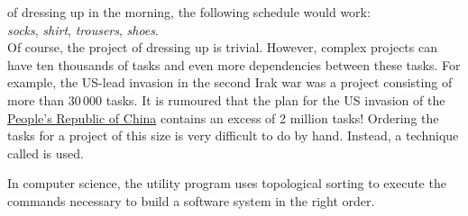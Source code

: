 of dressing up in the morning, the following schedule would work:
\\[0.2cm]
\hspace*{1.3cm}
\textsl{socks}, \textsl{shirt}, \textsl{trousers}, \textsl{shoes}.
\\[0.2cm]
Of course, the project of dressing up is trivial.
However, complex projects can have ten thousands of tasks and even more dependencies between these tasks.  For
example, the US-lead invasion in the second Irak war was a project consisting of more than $30\,000$ tasks.
It is rumoured that the plan for the US invasion of the
\href{https://en.wikipedia.org/wiki/China}{People's Republic of China}  
contains an excess of 2 million tasks!  Ordering the tasks for a project of this size is very difficult to do by
hand.  Instead, a technique called  is used. 

In computer science, the utility program \href{https://edoras.sdsu.edu/doc/make.html}{} uses
topological sorting to execute the commands necessary to build a software system in the right order.

